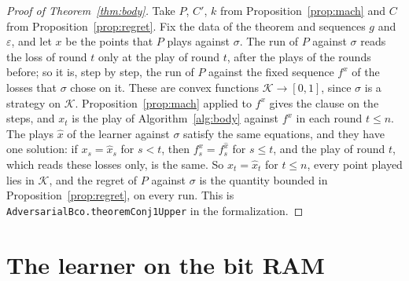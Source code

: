 \documentclass[11pt]{amsart}
\theoremstyle{definition}
\numberwithin{equation}{section}
\newcommand{\cK}{\mathcal{K}}
\begin{document}
\begin{proof}[Proof of Theorem~\ref{thm:body}]
Take $P$, $C'$, $k$ from Proposition~\ref{prop:mach} and $C$ from Proposition~\ref{prop:regret}. Fix the data of the theorem and sequences $g$ and $\varepsilon$, and let $x$ be the points that $P$ plays against $\sigma$. The run of $P$ against $\sigma$ reads the loss of round $t$ only at the play of round $t$, after the plays of the rounds before; so it is, step by step, the run of $P$ against the fixed sequence $f^x$ of the losses that $\sigma$ chose on it. These are convex functions $\cK\to[0,1]$, since $\sigma$ is a strategy on $\cK$. Proposition~\ref{prop:mach} applied to $f^x$ gives the clause on the steps, and $x_t$ is the play of Algorithm~\ref{alg:body} against $f^x$ in each round $t\le n$. The plays $\hat x$ of the learner against $\sigma$ satisfy the same equations, and they have one solution: if $x_s=\hat x_s$ for $s<t$, then $f^x_s=f^{\hat x}_s$ for $s\le t$, and the play of round $t$, which reads these losses only, is the same. So $x_t=\hat x_t$ for $t\le n$, every point played lies in $\cK$, and the regret of $P$ against $\sigma$ is the quantity bounded in Proposition~\ref{prop:regret}, on every run.
This is \texttt{AdversarialBco.theoremConj1Upper} in the formalization.
\end{proof}

\section{The learner on the bit RAM}\label{sec:bit}
\end{document}
